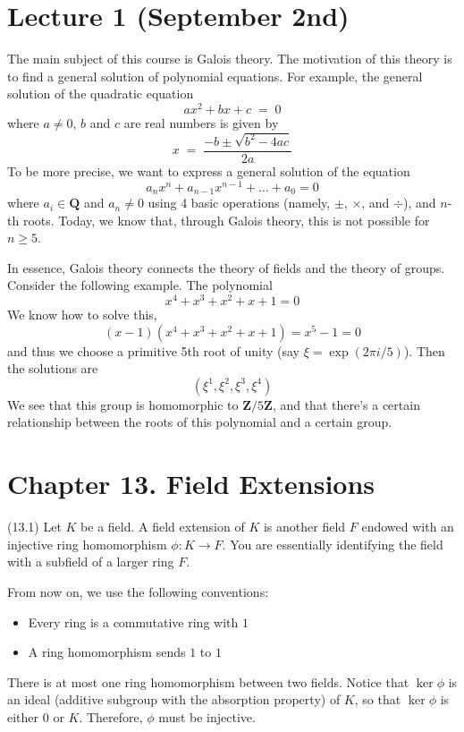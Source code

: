 \section{Lecture 1 (September 2nd)}
\begin{rmk}
The main subject of this course is Galois theory. The motivation of this theory is to find a general solution of polynomial equations. For example, the general solution of the quadratic equation
\[ax^2+bx+c\;=\;0\]
where $a\ne 0$, $b$ and $c$ are real numbers is given by
\[x\;=\;\dfrac{-b\pm\sqrt{b^2-4ac}}{2a}\]
To be more precise, we want to express a general solution of the equation
\[a_{n}x^{n}+a_{n-1}x^{n-1}+\ldots +a_{0}=0\]
where $a_{i}\in {\bm Q}$ and $a_{n}\ne 0$ using 4 basic operations (namely, $\pm$, $\times $, and $\div$), and $n$-th roots. Today, we know that, through Galois theory, this is not possible for $n\geq 5$. 

\bigskip

In essence, Galois theory connects the theory of fields and the theory of groups. Consider the following example. The polynomial
\[x^4+x^3+x^2+x+1=0\]
We know how to solve this,
\[(x-1)(x^4+x^3+x^2+x+1)=x^5-1=0\]
	and thus we choose a primitive 5th root of unity (say $\xi =\exp (2\pi i/5)$). Then the solutions are
\[(\xi^{1} ,\xi ^2,\xi ^3,\xi^{4})\]
We see that this group is homomorphic to ${\bm Z}/5{\bm Z}$, and that there's a certain relationship between the roots of this polynomial and a certain group.
\end{rmk}
\vspace{2ex}
\section{Chapter 13. Field Extensions}
\begin{defi}
(13.1) Let $K$ be a field. A field extension of $K$ is another field $F$ endowed with an injective ring homomorphism $\phi :K\rightarrow F$. You are essentially identifying the field with a subfield of a larger ring $F$.
\end{defi}
\vspace{2ex}
\begin{rmk}
From now on, we use the following conventions:
\begin{itemize}
	\item[(i)] Every ring is a commutative ring with $1$
	\item[(ii)] A ring homomorphism sends $1$ to $1$ 
\end{itemize}
\end{rmk}
\vspace{2ex}
\begin{rmk}
There is at most one ring homomorphism between two fields. Notice that $\mathop{\mathrm{ker}}\phi $ is an ideal (additive subgroup with the absorption property) of $K$, so that $\mathop{\mathrm{ker}}\phi $ is either $0$ or $K$. Therefore, $\phi $ must be injective.
\end{rmk}
\vspace{2ex}
\begin{itemize}

\end{itemize}

